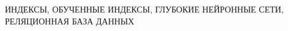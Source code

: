\begin{essay}{}
    \noindent\mbox{ИНДЕКСЫ,}  \mbox{ОБУЧЕННЫЕ} \mbox{ИНДЕКСЫ,} \mbox{ГЛУБОКИЕ}
    \mbox{НЕЙРОННЫЕ} \mbox{СЕТИ}, \mbox{РЕЛЯЦИОННАЯ} \mbox{БАЗА} \mbox{ДАННЫХ}
\end{essay}
